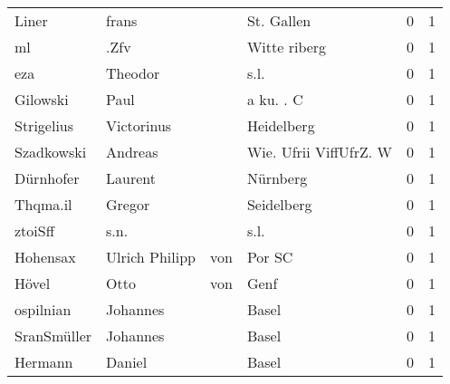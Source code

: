 \documentclass[10pt,a4paper,landscape]{article}
\begin{document}
\begin{longtable}{llllrr}
                    Liner &                              frans &             &                                  St. Gallen &          0 &         1 \\
                       ml &                               .Zfv &             &                                Witte riberg &          0 &         1 \\
                      eza &                            Theodor &             &                                        s.l. &          0 &         1 \\
                 Gilowski &                               Paul &             &                                   a ku. . C &          0 &         1 \\
               Strigelius &                         Victorinus &             &                                  Heidelberg &          0 &         1 \\
               Szadkowski &                            Andreas &             &                      Wie. Ufrii ViffUfrZ. W &          0 &         1 \\
                Dürnhofer &                            Laurent &             &                                    Nürnberg &          0 &         1 \\
                 Thqma.il &                             Gregor &             &                                  Seidelberg &          0 &         1 \\
                  ztoiSff &                               s.n. &             &                                        s.l. &          0 &         1 \\
                 Hohensax &                     Ulrich Philipp &         von &                                      Por SC &          0 &         1 \\
                    Hövel &                               Otto &         von &                                        Genf &          0 &         1 \\
                ospilnian &                           Johannes &             &                                       Basel &          0 &         1 \\
              SranSmüller &                           Johannes &             &                                       Basel &          0 &         1 \\
                  Hermann &                             Daniel &             &                                       Basel &          0 &         1 \\

\end{longtable}
\end{document}

